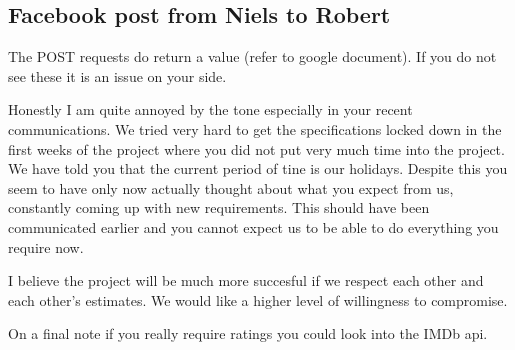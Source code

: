 \subsection{Facebook post from Niels to Robert}
\label{app:enough}
The POST requests do return a value (refer to google document). If you do not
see these it is an issue on your side.

Honestly I am quite annoyed by the tone especially in your recent
communications. We tried very hard to get the specifications locked down in the
first weeks of the project where you did not put very much time into the
project. We have told you that the current period of tine is our holidays.
Despite this you seem to have only now actually thought about what you expect
from us, constantly coming up with new requirements. This should have been
communicated earlier and you cannot expect us to be able to do everything you
require now.

I believe the project will be much more succesful if we respect each other and
each other's estimates. We would like a higher level of willingness to
compromise.

On a final note if you really require ratings you could look into the IMDb api.
